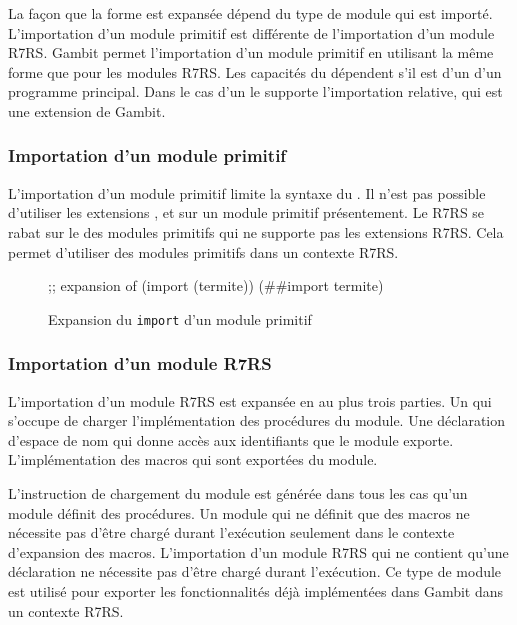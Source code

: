 La façon que la forme  est expansée dépend du type de module qui
est importé. L'importation d'un module primitif est différente de l'importation
d'un module R7RS. Gambit permet l'importation d'un module primitif en utilisant
la même forme que pour les modules R7RS. Les capacités du 
dépendent s'il est d'un  d'un programme principal. Dans
le cas d'un  le  supporte l'importation
relative, qui est une extension de Gambit.


\subsubsection{Importation d'un module primitif}
L'importation d'un module primitif limite la syntaxe du .
Il n'est pas possible d'utiliser les extensions , 
et  sur un module primitif présentement. Le  R7RS se rabat
sur le  des modules primitifs qui ne supporte pas les extensions R7RS.
Cela permet d'utiliser des modules primitifs dans un contexte R7RS.\\
\begin{figure}[ht]
\begin{mplisting}{0.8}
;; expansion of (import (termite))
(##import termite)
\end{mplisting}
    \caption{Expansion du \texttt{import} d'un module primitif}
    \label{fig:import->expand-primitive}
\end{figure}

\subsubsection{Importation d'un module R7RS}

L'importation d'un module R7RS est expansée en au plus trois parties.  Un
 qui s'occupe de charger l'implémentation des
procédures du module. Une déclaration d'espace de nom qui donne accès aux
identifiants que le module exporte. L'implémentation des macros qui sont
exportées du module.

L'instruction de chargement du module est générée dans tous les cas qu'un
module définit des procédures. Un module qui ne définit que des macros ne
nécessite pas d'être chargé durant l'exécution seulement dans le contexte
d'expansion des macros. L'importation d'un module R7RS qui ne contient qu'une
déclaration  ne nécessite pas d'être chargé durant l'exécution.
Ce type de module est utilisé pour exporter les fonctionnalités déjà
implémentées dans Gambit dans un contexte R7RS.


